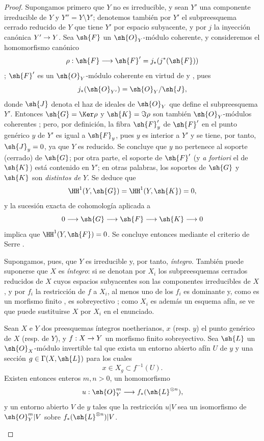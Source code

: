 \documentclass[oneside,10pt]{amsart}
\makeatletter
\newcommand{\ega@arrow}[2]{\mathchoice{#1}{#2}{#2}{#2}}
\renewcommand{\to}{\ega@arrow{\longrightarrow}{\rightarrow}}
\newcommand{\oldpage}[2][]{\marginnote{\normalfont\footnotesize\textbf{#1}~|~#2}\ignorespaces}
\let\EGAOriginalLabel\label
\renewcommand{\label}[1]{\phantomsection\EGAOriginalLabel{#1}}
\makeatother
\begin{document}
\begin{proof}
Supongamos primero que $Y$ no es irreducible, y sean $Y'$ una componente irreducible de $Y$ y $Y''=Y\setminus Y'$;
denotemos también por $Y'$ el subpreesquema cerrado reducido de $Y$ que tiene $Y'$ por espacio subyacente, y por $j$ la inyección canónica $Y'\to Y$.
Sea $\sh{F}$ un $\sh{O}_Y$-módulo coherente, y consideremos el homomorfismo canónico
\[
  \rho:\sh{F}\to\sh{F}'=j_*(j^*(\sh{F}))
\]
;
$\sh{F}'$ es un $\sh{O}_Y$-módulo coherente en virtud de  y , pues
\[
  j_*(\sh{O}_{Y'})=\sh{O}_Y/\sh{J},
\]
donde $\sh{J}$ denota el haz de ideales de $\sh{O}_Y$ que define el subpreesquema $Y'$.
Entonces $\sh{G}=\Ker\rho$ y $\sh{K}=\Im\rho$ son también $\sh{O}_Y$-módulos coherentes ;
pero, por definición, la fibra $\sh{F}'_y$ de $\sh{F}'$ en el punto genérico $y$ de $Y'$ es igual a $\sh{F}_y$, pues $y$ es interior a $Y'$ y se tiene, por tanto, $\sh{J}_y=0$, ya que $Y$ es reducido.
Se concluye que $y$ no pertenece al soporte (cerrado) de $\sh{G}$;
por otra parte, el soporte de $\sh{F}'$ (y \emph{a fortiori} el de $\sh{K}$) está contenido en $Y'$;
en otras palabras, los soportes de $\sh{G}$ y $\sh{K}$ son \emph{distintos de $Y$}.
Se deduce que
\[
  \HH^1(Y,\sh{G})=\HH^1(Y,\sh{K})=0,
\]
y la sucesión exacta de cohomología aplicada a
\[
  0\to\sh{G}\to\sh{F}\to\sh{K}\to0
\]
implica que $\HH^1(Y,\sh{F})=0$.
Se concluye entonces mediante el criterio de Serre .

Supongamos, pues, que $Y$ es irreducible y, por tanto, \emph{íntegro}.
También puede suponerse que $X$ es \emph{íntegro}:
si se denotan por $X_i$ los subpreesquemas cerrados reducidos de $X$ cuyos espacios subyacentes son las componentes irreducibles de $X$ , y por $f_i$ la restricción de $f$ a $X_i$, al menos uno de los $f_i$ es dominante y, como es un morfismo finito , es sobreyectivo ;
como $X_i$ es además un esquema afín, se ve que puede sustituirse $X$ por $X_i$ en el enunciado.

\begin{lemma}[6.7.1.1]
\label{II.6.7.1.1}
Sean $X$ e $Y$ dos preesquemas íntegros noetherianos, $x$ \textup{(resp. $y$)} el punto genérico de $X$ \textup{(resp. de $Y$)}, y $f:X\to Y$ un morfismo finito sobreyectivo.
Sea $\sh{L}$ un $\sh{O}_X$-módulo invertible tal que exista un entorno abierto afín $U$ de $y$ y una sección $g\in\Gamma(X,\sh{L})$ para los cuales
\[
  x\in X_g\subset f^{-1}(U).
\]
\oldpage[II]{137}
Existen entonces enteros $m,n>0$, un homomorfismo
\[
  u:\sh{O}_Y^m\to f_*(\sh{L}^{\otimes n}),
\]
y un entorno abierto $V$ de $y$ tales que la restricción $u|V$ sea un isomorfismo de $\sh{O}_Y^m|V$ sobre $f_*(\sh{L}^{\otimes n})|V$.
\end{lemma}


\end{proof}
\end{document}
